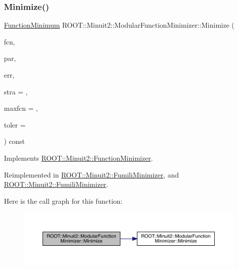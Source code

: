 \subsubsection{\texorpdfstring{Minimize()}{Minimize()}\hspace{0.1cm}{\footnotesize\ttfamily [3/22]}}
{\footnotesize\ttfamily \mbox{\hyperlink{classROOT_1_1Minuit2_1_1FunctionMinimum}{Function\+Minimum}} R\+O\+O\+T\+::\+Minuit2\+::\+Modular\+Function\+Minimizer\+::\+Minimize (\begin{DoxyParamCaption}\item[{const \mbox{\hyperlink{classROOT_1_1Minuit2_1_1FCNGradientBase}{F\+C\+N\+Gradient\+Base}} \&}]{fcn,  }\item[{const std\+::vector$<$ double $>$ \&}]{par,  }\item[{const std\+::vector$<$ double $>$ \&}]{err,  }\item[{unsigned int}]{stra = {},  }\item[{unsigned int}]{maxfcn = {},  }\item[{double}]{toler = {} }\end{DoxyParamCaption}) const\hspace{0.3cm}{\ttfamily [virtual]}}



Implements \mbox{\hyperlink{classROOT_1_1Minuit2_1_1FunctionMinimizer_ac6063af1cb58f0fd75b16d3cebc49f54}{R\+O\+O\+T\+::\+Minuit2\+::\+Function\+Minimizer}}.



Reimplemented in \mbox{\hyperlink{classROOT_1_1Minuit2_1_1FumiliMinimizer_a2bb7832765e33c24ffad4636ad3b7193}{R\+O\+O\+T\+::\+Minuit2\+::\+Fumili\+Minimizer}}, and \mbox{\hyperlink{classROOT_1_1Minuit2_1_1FumiliMinimizer_a2bb7832765e33c24ffad4636ad3b7193}{R\+O\+O\+T\+::\+Minuit2\+::\+Fumili\+Minimizer}}.

Here is the call graph for this function\+:\nopagebreak
\begin{figure}[H]
\begin{center}
\leavevmode
\includegraphics[width=350pt]{d3/dc8/classROOT_1_1Minuit2_1_1ModularFunctionMinimizer_a8a71d388729f9e81c3c031a2962f4d99_cgraph}
\end{center}
\end{figure}
\mbox{\label{classROOT_1_1Minuit2_1_1ModularFunctionMinimizer_a8354ed4403dda68040ea4d1b174835c1}} 
